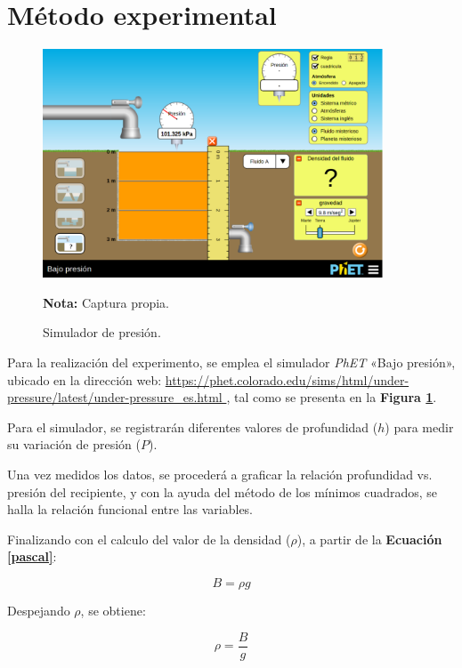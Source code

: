 \documentclass[letter,11pt]{article}
\newcommand{\source}[1]{\vspace{-11pt} \caption*{\small{\textbf{Nota:} {#1}}}}
\begin{document}
\section{Método experimental}

\begin{figure}
\centering
\includegraphics[width=0.90\textwidth]{resources/f2.eps}
\caption{Simulador de presión.}
\label{figura2}
\source{Captura propia.}
\end{figure}

Para la realización del experimento, se emplea el simulador \emph{PhET} «Bajo
presión», ubicado en la dirección web: \url{
https://phet.colorado.edu/sims/html/under-pressure/latest/under-pressure_es.html
}, tal como se presenta en la \textbf{Figura \ref{figura2}}.

Para el simulador, se registrarán diferentes valores de profundidad ($h$) para
medir su variación de presión ($P$).

Una vez medidos los datos, se procederá a graficar la relación profundidad vs.
presión del recipiente, y con la ayuda del método de los mínimos cuadrados, se
halla la relación funcional entre las variables.

Finalizando con el calculo del valor de la densidad ($\rho$), a partir de la
\textbf{Ecuación \ref{pascal}}:

\begin{equation*}
    B = \rho g
\end{equation*}
\vspace{0.10cm}

Despejando $\rho$, se obtiene:

\begin{equation}
    \rho = \frac{B}{g}
\label{densidad}
\end{equation}
\vspace{0.10cm}
\end{document}
